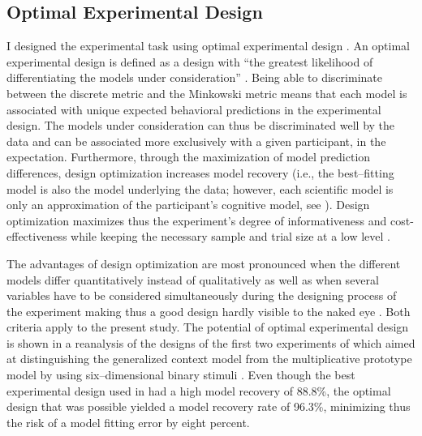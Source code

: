 \documentclass[a4paper,man,natbib]{apa6}
\begin{document}
\subsection{Optimal Experimental Design}
I designed the experimental task using optimal experimental design \citep{myung2009optimal}. An optimal experimental design is defined as a design with ``the greatest likelihood of differentiating the models under consideration'' \cite[][p. 500]{myung2009optimal}. Being able to discriminate between the discrete metric and the Minkowski metric means that each model is associated with unique expected behavioral predictions in the experimental design. The models under consideration can thus be discriminated well by the data and can be associated more exclusively with a given participant, in the expectation. Furthermore, through the maximization of model prediction differences, design optimization increases model recovery (i.e., the best--fitting model is also the model underlying the data; however, each scientific model is only an approximation of the participant's cognitive model, see \citealp{myung2009optimal}). 
Design optimization maximizes thus the experiment's degree of informativeness and cost-effectiveness while keeping the necessary sample and trial size at a low level \citep{cavagnaro2009better, ouyang2016practical, raffert2012optimally, atkinson2007optimum, nelson2005finding}. 

The advantages of design optimization are most pronounced when the different models differ quantitatively instead of qualitatively as well as when several variables have to be considered simultaneously during the designing process of the experiment making thus a good design hardly visible to the naked eye \citep{myung2009optimal}. Both criteria apply to the present study.
The potential of optimal experimental design is shown in a reanalysis of the designs of the first two experiments of \cite{smith1998prototypes} which aimed at distinguishing the generalized context model \citep{nosofsky1986attention} from the multiplicative prototype model \citep{smith1998prototypes} by using six--dimensional binary stimuli \citep{myung2009optimal}. Even though the best experimental design used in \citeauthor{smith1998prototypes} had a high model recovery of 88.8\%, the optimal design that was possible yielded a model recovery rate of 96.3\%, minimizing thus the risk of a model fitting error by eight percent.  
\end{document}

